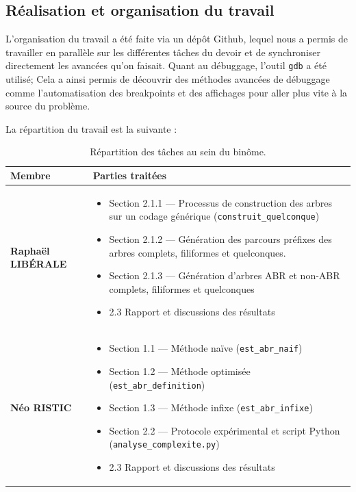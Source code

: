 \documentclass[12pt, a4paper]{article}
\begin{document}

\subsection{ Réalisation et organisation du travail}

L'organisation du travail a été faite via un dépôt Github, lequel nous a permis de travailler en parallèle sur les différentes tâches du devoir et de synchroniser directement les avancées qu'on faisait. Quant au débuggage, l'outil \texttt{gdb} a été utilisé; Cela a ainsi permis de découvrir des méthodes avancées de débuggage comme l'automatisation des breakpoints et des affichages pour aller plus vite à la source du problème. 

La répartition du travail est la suivante : \linebreak[2]

\begin{table}[H]
	\centering
	\begin{tabular}{>{\bfseries}l p{10cm}}
		\toprule
		\textbf{Membre} & \textbf{Parties traitées} \\
		\midrule
		Raphaël LIBÉRALE
		& \begin{itemize}[noitemsep, topsep=0pt, leftmargin=*]
			\item Section 2.1.1 — Processus de construction des arbres sur un codage générique (\texttt{construit\_quelconque})
			\item Section 2.1.2 — Génération des parcours préfixes des arbres complets, filiformes et quelconques.
			\item Section 2.1.3 — Génération d'arbres ABR et non-ABR complets, filiformes et quelconques
			\item 2.3 Rapport et discussions des résultats
			\end{itemize} \\
		\addlinespace
		Néo RISTIC
		& \begin{itemize}[noitemsep, topsep=0pt, leftmargin=*]
			\item Section 1.1 — Méthode naïve (\texttt{est\_abr\_naif})
			\item Section 1.2 — Méthode optimisée (\texttt{est\_abr\_definition})
			\item Section 1.3 — Méthode infixe (\texttt{est\_abr\_infixe})
			\item Section 2.2 — Protocole expérimental et script Python (\texttt{analyse\_complexite.py})
			\item 2.3 Rapport et discussions des résultats
		  \end{itemize} \\
		\bottomrule
	\end{tabular}
	\caption{Répartition des tâches au sein du binôme.}
	\label{tab:repartition}
\end{table}
\end{document}
